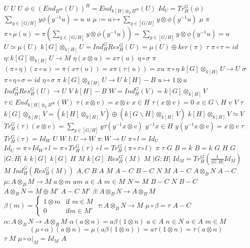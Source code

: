 \documentclass{article}
\begin{document}
$U$
$U$
$U$
$\phi \in (End_{B^{op}}(U))^{H}= End_{{k[H] \otimes_{k} B^{op}}}(U)$
$Id_{U} = Tr_{H}^{G}(\phi)$
$\sum_{y \in [G / H]} y \phi (y^{-1}u)=u$
$u$
$\mu := u \mapsto \sum_{y \in [G / H]} y \otimes \phi(y^{-1}u)$
$\mu$
$\pi$
$\pi \circ \mu (u) = \pi(\sum_{y \in [G / H]}y\otimes \phi(y^{-1}u)) = \sum_{y \in [G / H]} y \otimes \phi(y^{-1}u) = u$
$U \simeq \mu(U)$
$k[G] \otimes_{k[H]} U = Ind_{H}^{G} Res_{H}^{G}(U) = \mu(U) \oplus ker(\pi)$
$\tau$
$\pi \circ \tau = id$
$\eta: k[G]\otimes_{k[H]} U \rightarrow M$
$\eta(x\otimes u) = x \tau(u)$
$\eta \circ \sigma$
$\pi$
$(\pi \circ \eta)(x \circ u) = \pi(x \tau(u)) = x\pi(\tau(u)) = xu$
$\pi \circ \eta$
$k[G] \otimes_{k[H]} U \rightarrow U$
$\sigma$
$\pi \circ \eta \circ \sigma = id$
$\eta \circ \sigma$
$\pi$
$k[G]\otimes_{k[H]}U \rightarrow U$
$k[H]-B$
$u \mapsto 1\otimes u$
$Ind_{H}^{G} Res_{H}^{G}(U) \rightarrow U$
$V$
$k[H]-B$
$W = Ind_{H}^{G}(V) = k[G] \otimes_{k[H]} V$
$\tau \in End_{k[H] \otimes_{k} B^{op}} (W)$
$\tau(x \otimes v) = x \otimes v$
$x \in H$
$\tau(x \otimes v) =0$
$x \in G \backslash H$
$v$
$V$
$\tau$
$k[G] \otimes_{k[H]} V = (k[H] \otimes_{k[H]} V) \oplus (k[G \backslash H] \otimes_{k[H]} V)$
$k[H] \otimes_{k[H]} V \simeq V$
$Tr_{H}^{G}(\tau)(x \otimes v) = \sum_{y \in [G / H]} y\tau(y^{-1}x\otimes v)$
$y^{-1}x \in H$
$y(y^{-1}x \otimes v) = x \otimes v$
$\tau$
$Tr_{H}^{G}(\tau) = Id_{W}$
$U$
$W$
$l:U \rightarrow W$
$\pi: W \rightarrow U$
$\pi \circ l = Id_{U}$
$Id_{U} = \pi \circ Id_{W} \circ l = \pi \circ Tr_{H}^{G}(\tau) \circ l = Tr_{H}^{G}(\pi \circ \tau \circ l)$
$\pi$
$\tau$
$G$
$B = k$
$B=k$
$G$
$H$
$G$
$|G:H|$
$k$
$k[G]$
$k[G]$
$H$
$M$
$k[G]$
$Res_{H}^{G}(M)$
$M$
$|G:H|$
$Id_{M} = Tr_{H}^{G}\left( \frac{1}{|G:H|} Id_{M} \right)$
$M$
$Ind_{H}^{G}(Res_{H}^{G}(M))$
$A,C$
$B$
$A$
$M$
$A-C$
$B-C$
$N$
$M$
$A-C$
$A \otimes_{B} N$
$A-C$
$\mu:A \otimes_{B} M \rightarrow M$
$a \otimes m$
$am$
$a \in A$
$m \in M$
$N = M$
$B-C$
$N$
$B-C$
$A \otimes_{B} N = M \oplus M'$
$A-C$
$M'$
$\beta: A \otimes_{B} N \rightarrow A \otimes_{B} M$
$\beta(m) = \begin{cases}1\otimes m &\text{if } m \in M \\ 0 &\text{if} m \in M'\end{cases}$
$\tau:A\otimes_{B}N \rightarrow M$
$\mu \circ \beta = \tau$
$A-C$
$\alpha:A\otimes_{B}N \rightarrow A \otimes_{B}M$
$\alpha(a \otimes n) = a\beta(1\otimes n)$
$a \in A$
$n \in N$
$a \in A$
$m \in M$
$$(\mu \circ \alpha)(a \otimes n) = \mu(a\beta(1 \otimes n)) = a\tau(1 \otimes n) = \tau(a \otimes  n)$$
$\tau$
$M$
$\mu \circ \alpha|_{M} = Id_{M}$
$A$
\end{document}

